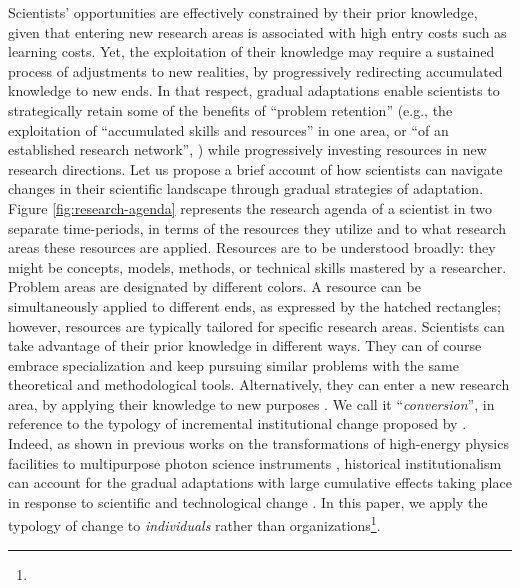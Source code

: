 \documentclass{article}
\begin{document}
Scientists' opportunities are effectively constrained by their prior knowledge, given that entering new research areas is associated with high entry costs such as learning costs. Yet, the exploitation of their knowledge may require a sustained process of adjustments to new realities, by progressively redirecting accumulated knowledge to new ends. In that respect, gradual adaptations enable scientists to strategically retain some of  the benefits of ``problem retention'' (e.g., the exploitation of ``accumulated skills and resources'' in one area, or ``of an established research network'', \citealt[p.~106]{Gieryn1978}) while progressively investing resources in new research directions. Let us propose a brief account of how scientists can navigate changes in their scientific landscape through gradual strategies of adaptation. Figure \ref{fig:research-agenda} %
represents the research agenda of a scientist in two separate time-periods, in terms of the resources they utilize and to what research areas these resources are applied. Resources are to be understood broadly: they might be concepts, models, methods, or technical skills mastered by a researcher. Problem areas are designated by different colors. A resource can be simultaneously applied to different ends, as expressed by the hatched rectangles; however, resources are typically tailored for specific research areas. Scientists can take advantage of their prior knowledge in different ways. They can of course embrace specialization and keep pursuing similar problems with the same theoretical and methodological tools.  
Alternatively, they can enter a new research area, by applying their knowledge to new purposes \citep{Mulkay1974,schon1963displacement}. We call it ``\textit{conversion}'', in reference to the typology of incremental institutional change proposed by \citet{mahoney_thelen_2009}. Indeed, as shown in previous works on the transformations of high-energy physics facilities to multipurpose photon science instruments  \citep{Hallonsten2013,Heinze2017a}, historical institutionalism can account for the gradual adaptations with large cumulative effects taking place in response to scientific and technological change \citep{Heinze2012}. In this paper, we apply the typology of change to \textit{individuals} rather than organizations\footnote{}. 
\end{document}
